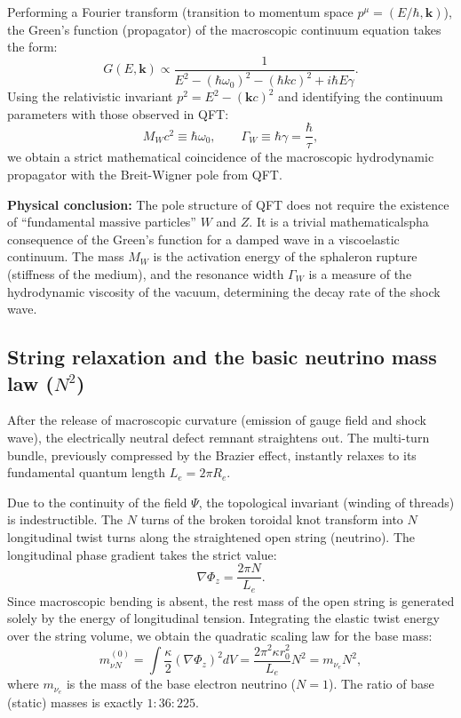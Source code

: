 \documentclass[11pt,a4paper]{article}
\begin{document}
Performing a Fourier transform (transition to momentum space $p^\mu = (E/\hbar, \mathbf{k})$), the Green's function (propagator) of the macroscopic continuum equation takes the form:
\begin{equation}
G(E, \mathbf{k}) \propto \frac{1}{E^2 - (\hbar\omega_0)^2 - (\hbar k c)^2 + i \hbar E \gamma}.
\end{equation}
Using the relativistic invariant $p^2 = E^2 - (\mathbf{k}c)^2$ and identifying the continuum parameters with those observed in QFT:
\begin{equation}
M_W c^2 \equiv \hbar \omega_0, \qquad \Gamma_W \equiv \hbar \gamma = \frac{\hbar}{\tau},
\end{equation}
we obtain a strict mathematical coincidence of the macroscopic hydrodynamic propagator with the Breit-Wigner pole from QFT. 

\textbf{Physical conclusion:} The pole structure of QFT does not require the existence of ``fundamental massive particles'' $W$ and $Z$. It is a trivial mathematicalspha consequence of the Green's function for a damped wave in a viscoelastic continuum. The mass $M_W$ is the activation energy of the sphaleron rupture (stiffness of the medium), and the resonance width $\Gamma_W$ is a measure of the hydrodynamic viscosity of the vacuum, determining the decay rate of the shock wave.
	
\subsection{String relaxation and the basic neutrino mass law ($N^2$)}
After the release of macroscopic curvature (emission of gauge field and shock wave), the electrically neutral defect remnant straightens out. The multi-turn bundle, previously compressed by the Brazier effect, instantly relaxes to its fundamental quantum length $L_e = 2\pi R_e$.
	
Due to the continuity of the field $\Psi$, the topological invariant (winding of threads) is indestructible. The $N$ turns of the broken toroidal knot transform into $N$ longitudinal twist turns along the straightened open string (neutrino). The longitudinal phase gradient takes the strict value:
\begin{equation}
\nabla \Phi_z = \frac{2\pi N}{L_e}.
\end{equation}
Since macroscopic bending is absent, the rest mass of the open string is generated solely by the energy of longitudinal tension. Integrating the elastic twist energy over the string volume, we obtain the quadratic scaling law for the base mass:
\begin{equation}
m_{\nu N}^{(0)} = \int \frac{\kappa}{2} (\nabla \Phi_z)^2 dV = \frac{2\pi^2 \kappa r_0^2}{L_e} N^2 = m_{\nu_e} N^2,
\label{eq:neutrino_n2}
\end{equation}
where $m_{\nu_e}$ is the mass of the base electron neutrino ($N=1$). The ratio of base (static) masses is exactly $1 : 36 : 225$.
	
\end{document}
